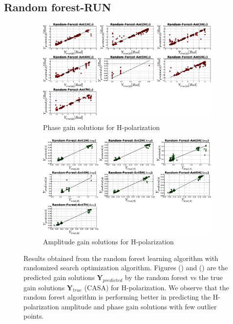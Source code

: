 \subsection{Random forest-RUN}
\begin{figure}[H]
   \centering
    \begin{subfigure}[t]{0.52\textheight}
        
        \includegraphics[width=\textwidth]{images/Random-ForestHphase.eps} 
        \caption{Phase gain solutions for H-polarization} \label{A2}
    \end{subfigure}
    
      \begin{subfigure}[t]{0.52\textheight}
       
        \includegraphics[width=\textwidth]{images/Random-ForestHamp.eps} 
        \caption{Amplitude gain solutions for H-polarization} \label{B2}
    \end{subfigure}
    \caption{Results obtained from the random forest learning algorithm with randomized search optimization algorithm. Figures () and () are the predicted gain solutions $\textbf{Y}_{predicted}$ by the random forest vs the true gain solutions $\textbf{Y}_{true}$ (CASA) for H-polarization. We observe that the random forest algorithm is performing better in predicting the H-polarization amplitude and phase gain solutions with few outlier points.}
    \label{BB2}
    \end{figure}
    
